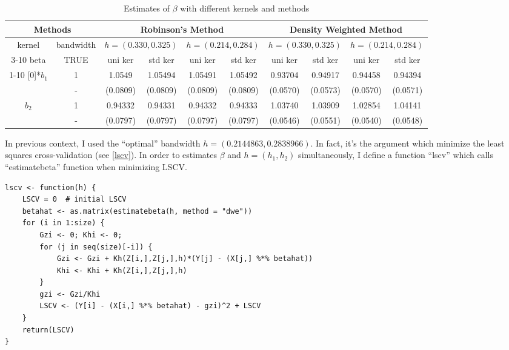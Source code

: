 \documentclass{article}
\begin{document}
\begin{table}[!htbp]
\small
  \centering
  \caption{Estimates of $\beta$ with different kernels and methods}
    \begin{tabular}{cc|cccc|cccc}
    \toprule
       \multicolumn{2}{c}{Methods}   & \multicolumn{4}{c}{Robinson\rq{}s Method}    & \multicolumn{4}{c}{Density Weighted Method} \\
    \midrule
     kernel &   bandwidth    & \multicolumn{2}{c}{$h=(0.330, 0.325)$} & \multicolumn{2}{c}{$h=(0.214,0.284)$} & \multicolumn{2}{c}{$h=(0.330, 0.325)$} & \multicolumn{2}{c}{$h=(0.214,0.284)$} \\
    \cline{3-10}
    beta  & TRUE  & uni ker  & std ker & uni ker & std ker & uni ker  & std ker & uni ker & std ker \\
    \cline{1-10}
    \multirow{2}[0]{*}{$b_{1}$} & 1     & 1.0549   & 1.05494
   & 1.05491 & 1.05492 & 0.93704 & 0.94917 & 0.94458 & 0.94394\\
   & -       & (0.0809) & (0.0809) & (0.0809) & (0.0809) & (0.0570) & (0.0573) & (0.0570) & (0.0571) \\
    \multirow{2}[1]{*}{$b_{2}$} & 1     & 0.94332   & 0.94331
   & 0.94332 & 0.94333 & 1.03740 & 1.03909 & 1.02854 & 1.04141\\
          & -     & (0.0797) & (0.0797) & (0.0797) & (0.0797) & (0.0546) & (0.0551) & (0.0540) & (0.0548) \\
    \bottomrule
    \end{tabular}%
  \label{tab:estimatebeta}%
\end{table}%


In previous context, I used the ``optimal'' bandwidth $h=(0.2144863,0.2838966)$. In fact, it\rq{}s the argument which minimize the least squares cross-validation (see \eqref{lscv}). In order to estimates $\beta$ and $h=(h_{1},h_{2})$ simultaneously, I define a function ``lscv'' which calls ``estimatebeta'' function when minimizing LSCV.
\begin{lstlisting}
lscv <- function(h) {
    LSCV = 0  # initial LSCV
    betahat <- as.matrix(estimatebeta(h, method = "dwe"))
    for (i in 1:size) {
        Gzi <- 0; Khi <- 0;
        for (j in seq(size)[-i]) {
            Gzi <- Gzi + Kh(Z[i,],Z[j,],h)*(Y[j] - (X[j,] %*% betahat))
            Khi <- Khi + Kh(Z[i,],Z[j,],h)
        }
        gzi <- Gzi/Khi
        LSCV <- (Y[i] - (X[i,] %*% betahat) - gzi)^2 + LSCV
    }
    return(LSCV)
}
\end{lstlisting}
\end{document}
